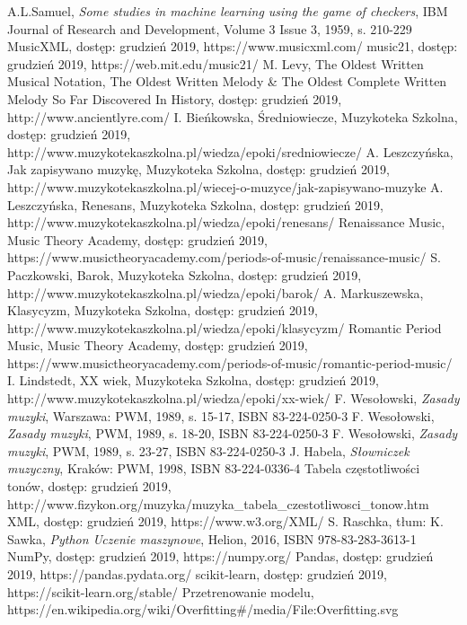 \documentclass[printmode, eng, openany]{mgr}
\begin{document}
\begin{flushleft}
\begin{thebibliography}{99}
 A.L.Samuel,
\emph{Some studies in machine learning using the game of checkers},
IBM Journal of Research and Development, Volume 3 Issue 3, 1959, s. 210-229
 MusicXML, dostęp: grudzień 2019, https://www.musicxml.com/
 music21, dostęp: grudzień  2019, https://web.mit.edu/music21/
 M. Levy, The Oldest Written Musical Notation, The Oldest Written Melody \& The Oldest Complete Written Melody So Far Discovered In History, dostęp: grudzień 2019, http://www.ancientlyre.com/
 I. Bieńkowska, Średniowiecze, Muzykoteka Szkolna, dostęp: grudzień  2019, http://www.muzykotekaszkolna.pl/wiedza/epoki/sredniowiecze/
 A. Leszczyńska, Jak zapisywano muzykę, Muzykoteka Szkolna, dostęp: grudzień  2019, http://www.muzykotekaszkolna.pl/wiecej-o-muzyce/jak-zapisywano-muzyke
 A. Leszczyńska, Renesans, Muzykoteka Szkolna, dostęp: grudzień  2019, http://www.muzykotekaszkolna.pl/wiedza/epoki/renesans/
 Renaissance Music, Music Theory Academy, dostęp: grudzień  2019,  https://www.musictheoryacademy.com/periods-of-music/renaissance-music/
 S. Paczkowski, Barok, Muzykoteka Szkolna, dostęp: grudzień 2019, http://www.muzykotekaszkolna.pl/wiedza/epoki/barok/
 A. Markuszewska, Klasycyzm, Muzykoteka Szkolna, dostęp: grudzień 2019, http://www.muzykotekaszkolna.pl/wiedza/epoki/klasycyzm/
 Romantic Period Music, Music Theory Academy, dostęp: grudzień 2019, 
https://www.musictheoryacademy.com/periods-of-music/romantic-period-music/
 I. Lindstedt, XX wiek, Muzykoteka Szkolna, dostęp: grudzień 2019, http://www.muzykotekaszkolna.pl/wiedza/epoki/xx-wiek/
 F. Wesołowski, \emph{Zasady muzyki}, Warszawa: PWM, 1989, s. 15-17, ISBN 83-224-0250-3 
 F. Wesołowski, \emph{Zasady muzyki}, PWM, 1989, s. 18-20, ISBN 83-224-0250-3 
 F. Wesołowski, \emph{Zasady muzyki}, PWM, 1989, s. 23-27, ISBN 83-224-0250-3 
 J. Habela, \emph{Słowniczek muzyczny},
 Kraków: PWM, 1998, ISBN 83-224-0336-4
 Tabela częstotliwości tonów, dostęp: grudzień 2019, http://www.fizykon.org/muzyka/muzyka\_tabela\_czestotliwosci\_tonow.htm
 XML, dostęp: grudzień 2019, https://www.w3.org/XML/
 S. Raschka, tłum: K. Sawka, \emph{Python Uczenie maszynowe}, Helion, 2016, ISBN 978-83-283-3613-1
 NumPy, dostęp: grudzień 2019, https://numpy.org/
 Pandas, dostęp: grudzień 2019, https://pandas.pydata.org/
 scikit-learn, dostęp: grudzień 2019, https://scikit-learn.org/stable/
 Przetrenowanie modelu, https://en.wikipedia.org/wiki/Overfitting\#/media/File:Overfitting.svg
\end{thebibliography}
\end{flushleft}
\end{document}
